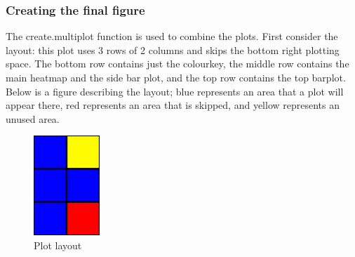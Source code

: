 \documentclass[letterpaper]{report}\usepackage[]{graphicx}\usepackage[]{color}
\begin{document}
\subsubsection{Creating the final figure}

The create.multiplot function is used to combine the plots. First consider the layout: this plot uses 3 rows of 2 columns and skips the bottom right plotting space. The bottom row contains just the colourkey, the middle row contains the main heatmap and the side bar plot, and the top row contains the top barplot. Below is a figure describing the layout; blue represents an area that a plot will appear there, red represents an area that is skipped, and yellow represents an unused area.

\begin{figure}[!ht]
  \begin{center}
     \includegraphics[width=25mm]{Figures/ex2_schematic.pdf}
     \caption{Plot layout}
     \label{fig:picture}
  \end{center}
\end{figure}
\end{document}
